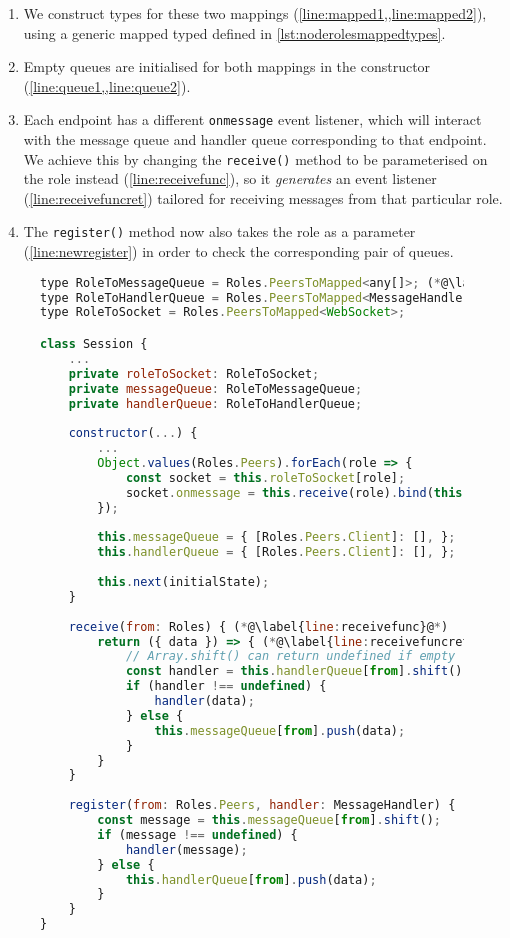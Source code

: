 \begin{enumerate}
\item We construct types for these two mappings 
(\cref{line:mapped1,,line:mapped2}), 
using a generic mapped typed defined in
\cref{lst:noderolesmappedtypes}.

\item Empty queues are initialised for both mappings
in the constructor (\cref{line:queue1,,line:queue2}).

\item Each endpoint has a different \texttt{onmessage}
event listener, which will interact with the message queue
and handler queue corresponding to that endpoint. 
We achieve this by changing the \texttt{receive()} method
to be parameterised on the role instead 
(\cref{line:receivefunc}),
so it \textit{generates} an event listener 
(\cref{line:receivefuncret})
tailored for receiving messages
from that particular role.

\item
The \texttt{register()} method now also takes the role
as a parameter (\cref{line:newregister}) in order to check the 
corresponding pair of queues.
\end{enumerate}

\begin{figure}[!h]
\begin{lstlisting}[language=javascript,tabsize=2]
type RoleToMessageQueue = Roles.PeersToMapped<any[]>; (*@\label{line:mapped1}@*)
type RoleToHandlerQueue = Roles.PeersToMapped<MessageHandler[]>; (*@\label{line:mapped2}@*)
type RoleToSocket = Roles.PeersToMapped<WebSocket>;

class Session {
	...
	private roleToSocket: RoleToSocket;
	private messageQueue: RoleToMessageQueue;
	private handlerQueue: RoleToHandlerQueue;
	
	constructor(...) {
		...
		Object.values(Roles.Peers).forEach(role => {
			const socket = this.roleToSocket[role];
			socket.onmessage = this.receive(role).bind(this);
		});
		
		this.messageQueue = { [Roles.Peers.Client]: [], }; (*@\label{line:queue1}@*)
		this.handlerQueue = { [Roles.Peers.Client]: [], }; (*@\label{line:queue2}@*)
		
		this.next(initialState);	
	}
	
	receive(from: Roles) { (*@\label{line:receivefunc}@*)
		return ({ data }) => { (*@\label{line:receivefuncret}@*)
			// Array.shift() can return undefined if empty
			const handler = this.handlerQueue[from].shift();
			if (handler !== undefined) {
				handler(data);
			} else {
				this.messageQueue[from].push(data);			
			}
		}
	}
	
	register(from: Roles.Peers, handler: MessageHandler) { (*@\label{line:newregister}@*)
		const message = this.messageQueue[from].shift();
		if (message !== undefined) {
			handler(message);		
		} else {
			this.handlerQueue[from].push(data);		
		}
	}
}
\end{lstlisting}
\label{lst:nodesession}
\end{figure}

